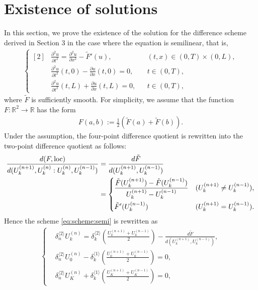 \documentclass[dvipdfmx-if-dvi,autodetect-engine,ja=standard]{amsart}
\numberwithin{equation}{section} %
\DeclareMathOperator{\loc}{loc}
\begin{document}
\section{Existence of solutions}
In this section, we prove the existence of
the solution for the difference scheme derived in
Section 3
in the case where the equation is semilinear, 
that is,
\begin{align}\label{eq:sdw:sec5}
    \left\{ \begin{aligned}[2]
    &\frac{\partial^2 u}{\partial t^2} = \frac{\partial^2 u}{\partial x^2} - \tilde{F}'(u),
    &&(t,x) \in (0,T)\times (0,L),\\
    &\frac{\partial^2 u}{\partial t^2}(t,0)
    - \frac{\partial u}{\partial x}(t,0) = 0,
    &&t\in (0,T),\\
    &\frac{\partial^2 u}{\partial t^2}(t,L)
    + \frac{\partial u}{\partial x}(t,L) = 0,
    &&t\in (0,T),
    \end{aligned}\right.
\end{align}
where $\tilde{F}$ is sufficiently smooth. 
For simplicity, we assume that the function 
$F: \mathbb{R}^2 \to \mathbb{R}$
has the form
\begin{align}\label{eq:F:sec5}
    F(a,b) := \frac{1}{2} \left( \tilde{F}(a) + \tilde{F}(b) \right).
\end{align}
Under the assumption, the four-point difference quotient is rewritten into 
the two-point difference quotient as follows: 
\begin{align*}
    \frac{d(F,\loc)}{d(U_k^{(n+1)},U_k^{(n)} : U_k^{(n)}, U_k^{(n-1)})} &= \frac{d \tilde{F}}{d(U_k^{(n+1)}, U_k^{(n-1)})} \\  
    &=\begin{dcases} 
    \frac{\tilde{F}(U_k^{(n+1)}) - \tilde{F}(U_k^{(n-1)})}{U_k^{(n+1)} -  U_k^{(n-1)}} &(U_k^{(n+1)} \neq U_k^{(n-1)}), \\
    \tilde{F}'(U_k^{(n-1)}) &(U_k^{(n+1)} =  U_k^{(n-1)}).
    \end{dcases}
\end{align*}
Hence the scheme \eqref{eq:scheme:semi} is rewritten as 
\begin{align}\label{eq:scheme:semi:sec4}
    \left\{
    \begin{alignedat}{1}
    &\delta_n^{\langle 2\rangle} U_k^{(n)}
    = \delta_k^{\langle 2 \rangle}
    \left(
        \frac{U_k^{(n+1)}+U_k^{(n-1)}}{2}
    \right)
    - \frac{d \tilde{F}}{d(U_k^{(n+1)}, U_k^{(n-1)})},\\
    &\delta_n^{\langle 2\rangle} U_0^{(n)}
        - \delta_k^{\langle 1 \rangle}
        \left(
            \frac{U_0^{(n+1)}+U_0^{(n-1)}}{2}
        \right)
        = 0,\\
    &\delta_n^{\langle 2\rangle} U_K^{(n)}
       + \delta_k^{\langle 1 \rangle}
        \left(
            \frac{U_K^{(n+1)}+U_K^{(n-1)}}{2}
        \right)
        = 0,
    \end{alignedat}
    \right.
\end{align}
\end{document}
